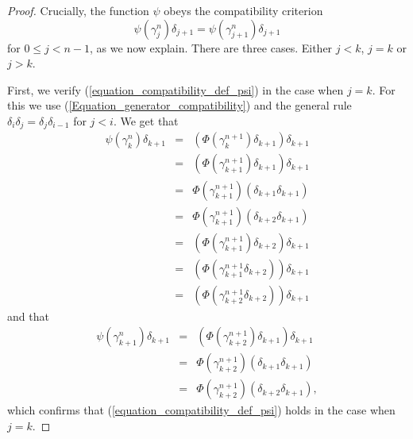 \begin{proof}
Crucially, the function $\psi$ obeys the compatibility criterion
\begin{equation}\label{equation_compatibility_def_psi}
 \psi (\gamma ^n_j)\delta _{j+1}=\psi (\gamma ^n_{j+1})\delta _{j+1}
\end{equation}
for $0\leq j<n-1$, as we now explain. There are three cases. Either $j<k$, $j=k$ or $j>k$.

First, we verify (\ref{equation_compatibility_def_psi}) in the case when $j=k$. For this we use (\ref{Equation_generator_compatibility}) and the general rule $\delta _i\delta _j=\delta _j\delta _{i-1}$ for $j<i$. We get that
\begin{displaymath}
\begin{array}{rcl}
\psi (\gamma ^n_k)\delta _{k+1} & = & (\Phi (\gamma ^{n+1}_k)\delta _{k+1})\delta _{k+1} \\
& = & (\Phi (\gamma ^{n+1}_{k+1})\delta _{k+1})\delta _{k+1} \\
& = & \Phi (\gamma ^{n+1}_{k+1})(\delta _{k+1}\delta _{k+1}) \\
& = & \Phi (\gamma ^{n+1}_{k+1})(\delta _{k+2}\delta _{k+1}) \\
& = & (\Phi (\gamma ^{n+1}_{k+1})\delta _{k+2})\delta _{k+1} \\
& = & (\Phi (\gamma ^{n+1}_{k+1}\delta _{k+2}))\delta _{k+1} \\
& = & (\Phi (\gamma ^{n+1}_{k+2}\delta _{k+2}))\delta _{k+1}
\end{array}
\end{displaymath}
and that
\begin{displaymath}
\begin{array}{rcl}
\psi (\gamma ^n_{k+1})\delta _{k+1} & = & (\Phi (\gamma ^{n+1}_{k+2})\delta _{k+1})\delta _{k+1} \\
& = & \Phi (\gamma ^{n+1}_{k+2})(\delta _{k+1}\delta _{k+1}) \\
& = & \Phi (\gamma ^{n+1}_{k+2})(\delta _{k+2}\delta _{k+1}),
\end{array}
\end{displaymath}
which confirms that (\ref{equation_compatibility_def_psi}) holds in the case when $j=k$.


\end{proof}
